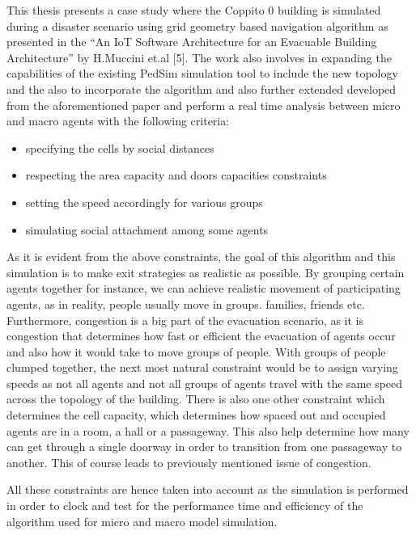 This thesis presents a case study where the Coppito 0 building is simulated during a disaster scenario using grid geometry based navigation algorithm as presented in the “An IoT Software Architecture for an Evacuable Building Architecture” by H.Muccini et.al [5]. The work also involves in expanding the capabilities of the existing PedSim simulation tool to include the new topology and the also to incorporate the algorithm and also further extended developed from the aforementioned paper and perform a real time analysis between micro and macro agents with the following criteria:

\begin{itemize}
  \item specifying the cells by social distances
  \item respecting the area capacity and doors capacities constraints
  \item setting the speed accordingly for various groups
  \item simulating social attachment among some agents 
\end{itemize}

As it is evident from the above constraints, the goal of this algorithm and this simulation is to make exit strategies as realistic as possible. By grouping certain agents together for instance, we can achieve realistic movement of participating agents, as in reality, people usually move in groups. families, friends etc. Furthermore, congestion is a big part of the evacuation scenario, as it is congestion that determines how fast or efficient the evacuation of agents occur and also how it would take to move groups of people. With groups of people clumped together, the next most natural constraint would be to assign varying speeds as not all agents and not all groups of agents travel with the same speed across the topology of the building. There is also one other constraint which determines the cell capacity, which determines how spaced out and occupied agents are in a room, a hall or a passageway. This also help determine how many can get through a single doorway in order to transition from one passageway to another. This of course leads to previously mentioned issue of congestion. 

All these constraints are hence taken into account as the simulation is performed in order to clock and test for the performance time and efficiency of the algorithm used for micro and macro model simulation.

